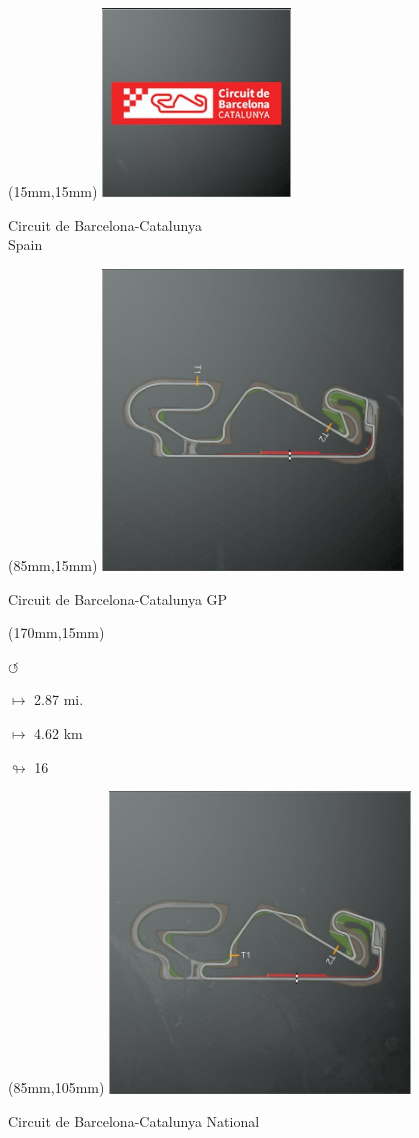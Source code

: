 \begin{textblock*}{60mm}(15mm,15mm)%
\includegraphics[width=50mm]{LG/2015-05-20_00078.png}
\par Circuit de Barcelona-Catalunya\\ Spain
\end{textblock*}
\begin{textblock*}{80mm}(85mm,15mm)%
\includegraphics[width=80mm]{TR/2015-05-20_00018.png}
\centerline{Circuit de Barcelona-Catalunya GP}
\end{textblock*}
\begin{textblock*}{30mm}(170mm,15mm)%
\par \Huge$\circlearrowleft$
\Large
\par$\mapsto$ 2.87 mi.
\par$\mapsto$ 4.62 km
\par$\looparrowright$ 16
\end{textblock*}
\begin{textblock*}{80mm}(85mm,105mm)%
\includegraphics[width=80mm]{TR/2015-05-20_00019.png}
\centerline{Circuit de Barcelona-Catalunya National}
\end{textblock*}
